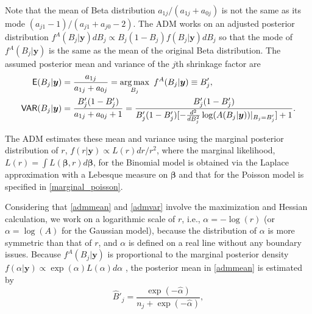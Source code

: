 \documentclass[article]{jss}
\DeclareMathOperator*{\argmax}{arg\,max}
\begin{document}
Note that the mean of Beta distribution $a_{1j}/(a_{1j}+a_{0j})$ is not the same as its mode $(a_{j1}-1)/(a_{j1}+a_{j0}-2)$. The ADM works on an adjusted posterior distribution $f^A(B_j\vert \boldsymbol{y})dB_j\propto B_j(1-B_j)f(B_j\vert \boldsymbol{y})dB_j$ so that the mode of $f^A(B_j\vert \boldsymbol{y})$ is the same as the mean of the original Beta distribution. The assumed posterior mean and variance of the $j$th shrinkage factor are
\begin{align}
\E(B_j\vert\boldsymbol{y})&=\frac{a_{1j}}{a_{1j}+a_{0j}}=\argmax_{B_j}~ f^A(B_j\vert \boldsymbol{y})\equiv B'_j,\label{admmean}\\
\VAR(B_j\vert\boldsymbol{y})&=\frac{B'_j(1-B'_j)}{a_{1j}+a_{0j}+1}=\frac{B'_j(1-B'_j)}{B'_j(1-B'_j)[-\frac{d^2}{dB^2_j}\log(A(B_j\vert \boldsymbol{y}))\vert_{B_j=B'_j}] +1}.\label{admvar}
\end{align}

The ADM estimates these mean and variance using the marginal posterior distribution of $r$, $f(r\vert\boldsymbol{y})\propto L(r)dr/r^2$, where the marginal likelihood, $L(r)=\int L(\boldsymbol{\beta}, r)d\boldsymbol{\beta}$, for the Binomial model is obtained via the Laplace approximation with a Lebesque measure on $\boldsymbol{\beta}$ and that for the Poisson model is specified in  \eqref{marginal_poisson}. %

Considering that  \eqref{admmean} and  \eqref{admvar} involve the maximization and Hessian calculation, we work on a logarithmic scale of $r$, i.e., $\alpha=-\log(r)$ (or $\alpha=\log(A)$ for the Gaussian model), because the distribution of $\alpha$ is more symmetric than that of $r$, and $\alpha$ is defined on a real line without any boundary issues. Because $f^A(B_j\vert\boldsymbol{y})$ is proportional to the marginal posterior density $f(\alpha\vert\boldsymbol{y})\propto \exp(\alpha) L(\alpha)d\alpha$ \citep{tang2011}, the  posterior mean in  \eqref{admmean} is estimated by
\begin{equation}\label{meaninvariance}
\hat{B}'_j=\frac{\exp(-\hat{\alpha})}{n_j+\exp(-\hat{\alpha})},
\end{equation}

\end{document}
